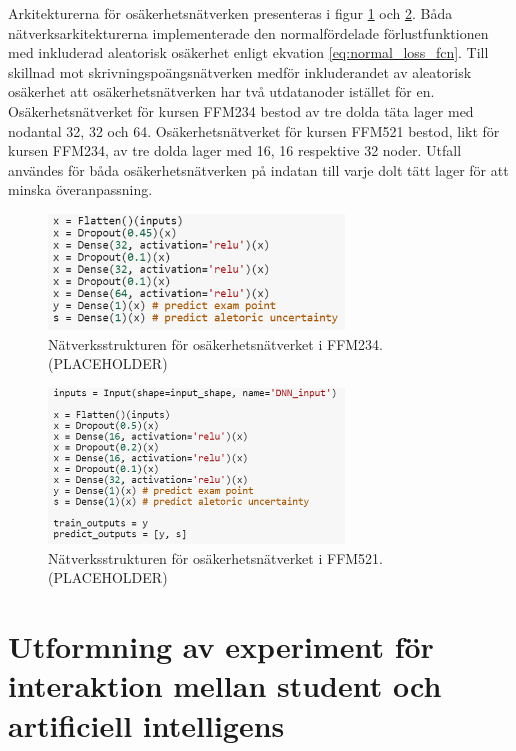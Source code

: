 Arkitekturerna för osäkerhetsnätverken presenteras i figur \ref{fig:uncert_net_ffm234} och \ref{fig:uncert_net_ffm521}. Båda nätverksarkitekturerna implementerade den normalfördelade förlustfunktionen med inkluderad aleatorisk osäkerhet enligt ekvation \eqref{eq:normal_loss_fcn}. Till skillnad mot skrivningspoängsnätverken medför inkluderandet av aleatorisk osäkerhet att osäkerhetsnätverken har två utdatanoder istället för en. Osäkerhetsnätverket för kursen FFM234 bestod av tre dolda täta lager med nodantal 32, 32 och 64. Osäkerhetsnätverket för kursen FFM521 bestod, likt för kursen FFM234, av tre dolda lager med 16, 16 respektive 32 noder. Utfall användes för båda osäkerhetsnätverken på indatan till varje dolt tätt lager för att minska överanpassning.

\begin{figure}[h]
    \centering
    \includegraphics[width=0.7\textwidth]{images/methodpictures/uncert-net-ffm234.PNG}
    \caption{Nätverksstrukturen för osäkerhetsnätverket i FFM234. (PLACEHOLDER)}
    \label{fig:uncert_net_ffm234}
\end{figure}

\begin{figure}[h]
    \centering
    \includegraphics[width=0.7\textwidth]{images/methodpictures/uncert-net-ffm521.PNG}
    \caption{Nätverksstrukturen för osäkerhetsnätverket i FFM521. (PLACEHOLDER)}
    \label{fig:uncert_net_ffm521}
\end{figure}

\section{Utformning av experiment för interaktion mellan student och artificiell intelligens}